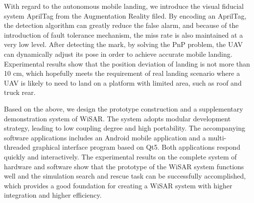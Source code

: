 {With regard to the autonomous mobile landing, we introduce the visual fiducial system AprilTag from the Augmentation Reality filed. By encoding an AprilTag, the detection algorithm can greatly reduce the false alarm, and because of the introduction of fault tolerance mechanism, the miss rate is also maintained at a very low level. After detecting the mark, by solving the PnP problem, the UAV can dynamically adjust its pose in order to achieve accurate mobile landing. Experimental results show that the position deviation of landing is not more than 10 cm, which hopefully meets the requirement of real landing scenario where a UAV is likely to need to land on a platform with limited area, such as roof and truck rear.

Based on the above, we design the prototype construction and a supplementary demonstration system of WiSAR. The system adopts modular development strategy, leading to low coupling degree and high portability. The accompanying software applications includes an Android mobile application and a multi-threaded graphical interface program based on Qt5. Both applications respond quickly and interactively. The experimental results on the complete system of hardware and software show that the prototype of the WiSAR system functions well and the simulation search and rescue task can be successfully accomplished, which provides a good foundation for creating a WiSAR system with higher integration and higher efficiency.

\thispagestyle{empty}
}

